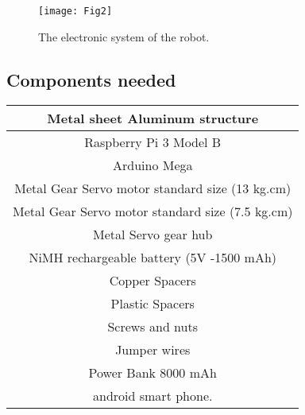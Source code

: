 \begin{figure}[h]
	\centering
	\texttt{[image: Fig2]}
	\caption{ The electronic system of the robot.}
	\label{fig4}
\end{figure}
\subsection{Components needed}

\begin{center}
    \begin{tabular}{ |c| }
        \hline
        Metal sheet Aluminum structure         \\ \hline
        Raspberry Pi 3 Model B                       \\ \hline
        Arduino Mega                                     \\ \hline
        Metal Gear Servo motor standard size (13 kg.cm)  \\ \hline
        Metal Gear Servo motor standard size (7.5 kg.cm) \\ \hline
        Metal Servo gear hub                                             \\ \hline
        NiMH rechargeable battery (5V -1500 mAh)           \\ \hline
        Copper Spacers                                 \\ \hline
        Plastic Spacers                                  \\ \hline
        Screws and nuts                                \\ \hline
        Jumper wires                                     \\ \hline
        Power Bank 8000 mAh                       \\ \hline
        android smart phone.                         \\ \hline
    \end{tabular}
\end{center}
